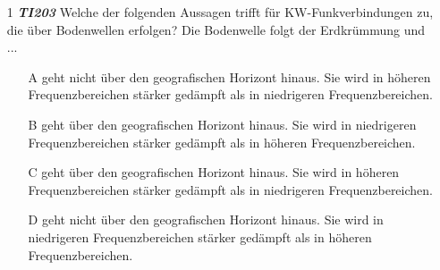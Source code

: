 \begin{figure}[H]
\end{figure}


\begin{enumerate} 
\itemsep1pt\parskip0pt
\item[1] \emph{\textbf{TI203}}  Welche der folgenden Aussagen trifft für KW-Funkverbindungen zu, die über Bodenwellen erfolgen? Die Bodenwelle folgt der Erdkrümmung und ...
	\begin{enumerate}
	\itemsep1pt\parskip0pt
		\item[A] geht nicht über den geografischen Horizont hinaus. Sie wird in höheren Frequenzbereichen stärker gedämpft als in niedrigeren Frequenzbereichen.
		\item[B] geht über den geografischen Horizont hinaus. Sie wird in niedrigeren Frequenzbereichen stärker gedämpft als in höheren Frequenzbereichen.
		\item[C] geht über den geografischen Horizont hinaus. Sie wird in höheren Frequenzbereichen stärker gedämpft als in niedrigeren Frequenzbereichen.
		\item[D] geht nicht über den geografischen Horizont hinaus. Sie wird in niedrigeren Frequenzbereichen stärker gedämpft als in höheren Frequenzbereichen.
	\end{enumerate}
\end{enumerate}